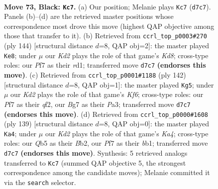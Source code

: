 \documentclass[11pt]{article}
\begin{document}
\clearpage

\begin{figure}[p]\centering
\begin{subfigure}{0.46\textwidth}\centering
\resizebox{\linewidth}{!}{%
\newchessgame
\chessboard[
  setfen={8/3k1pb1/8/1q6/7K/8/8/8 b - - 1 73},
  showmover=false,
  pgfstyle=straightmove, color=movearrow, markmove={d7-c7}
]}
\caption{}
\end{subfigure}\hfill
\begin{subfigure}{0.46\textwidth}\centering
\resizebox{\linewidth}{!}{%
\newchessgame
\chessboard[
  setfen={1Q1K4/8/4k3/8/8/8/8/3r4 w - - 3 73},
  showmover=false,
  pgfstyle=straightmove, color=movearrow, markmove={d8-e8}
]}
\caption{}
\end{subfigure}
\\[4pt]
\begin{subfigure}{0.46\textwidth}\centering
\resizebox{\linewidth}{!}{%
\newchessgame
\chessboard[
  setfen={3Q4/8/5K2/1p6/8/P7/5q2/1k6 w - - 12 72},
  showmover=false,
  pgfstyle=straightmove, color=movearrow, markmove={f6-g5}
]}
\caption{}
\end{subfigure}\hfill
\begin{subfigure}{0.46\textwidth}\centering
\resizebox{\linewidth}{!}{%
\newchessgame
\chessboard[
  setfen={8/8/8/k2K4/8/8/1b6/1B6 b - - 6 70},
  showmover=false,
  pgfstyle=straightmove, color=movearrow, markmove={a5-a4}
]}
\caption{}
\end{subfigure}
\caption{\textbf{Move 73, Black: \texttt{Kc7}.} (a) Our position; Melanie plays \texttt{Kc7} (\texttt{d7c7}). Panels (b)--(d) are the retrieved master positions whose correspondence most drove this move (highest QAP objective among those that transfer to it). (b) Retrieved from \texttt{ccrl\_top\_p0003\#270} (ply 144) [structural distance $d$=8, QAP obj=2]: the master played \texttt{Ke8}; under $\mu$ our \emph{Kd2} plays the role of that game's \emph{Kd8}; cross-type roles: our \emph{P}f7 as their \emph{r}d1; transferred move \texttt{d7c7} \textbf{(endorses this move)}. (c) Retrieved from \texttt{ccrl\_top\_p0001\#1188} (ply 142) [structural distance $d$=8, QAP obj=1]: the master played \texttt{Kg5}; under $\mu$ our \emph{Kd2} plays the role of that game's \emph{Kf6}; cross-type roles: our \emph{P}f7 as their \emph{q}f2, our \emph{B}g7 as their \emph{P}a3; transferred move \texttt{d7c7} \textbf{(endorses this move)}. (d) Retrieved from \texttt{ccrl\_top\_p0000\#1608} (ply 139) [structural distance $d$=8, QAP obj=0]: the master played \texttt{Ka4}; under $\mu$ our \emph{Kd2} plays the role of that game's \emph{Ka4}; cross-type roles: our \emph{Q}b5 as their \emph{B}b2, our \emph{P}f7 as their \emph{b}b1; transferred move \texttt{d7c7} \textbf{(endorses this move)}. Synthesis: 5 retrieved analogs transferred to \texttt{Kc7} (summed QAP objective 5, the strongest correspondence among the candidate moves); Melanie committed it via the \texttt{search} selector.}
\label{fig:thought-m145}
\end{figure}
\end{document}
